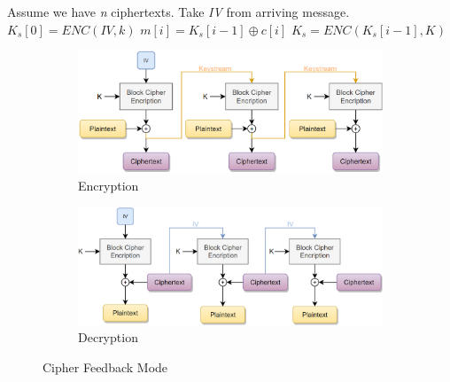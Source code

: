 \begin{definition}
\begin{algorithmic}[1]
\State Assume we have \textit{n} ciphertexts.
\State Take \textit{IV} from arriving message.
\State $K_s[0] = ENC(IV, k)$
\State $m[i] = K_s[i-1]\oplus{c[i]}$
\State $K_s = ENC(K_s[i-1], K)$
\EndFor
\end{algorithmic}
\end{definition}

\begin{figure}[h]
    \centering
    \begin{subfigure}[b]{0.48\textwidth}
    \includegraphics[width=\textwidth]{image/cfbenc.png}
    \caption{Encryption}
    \label{fig:cfbenc}
    \end{subfigure}\quad
    \begin{subfigure}[b]{0.48\textwidth}
    \includegraphics[width=\textwidth]{image/cfbdec.png}
    \caption{Decryption}
    \label{fig:cfbdec}
    \end{subfigure}
    \caption{Cipher Feedback Mode}
\end{figure}
